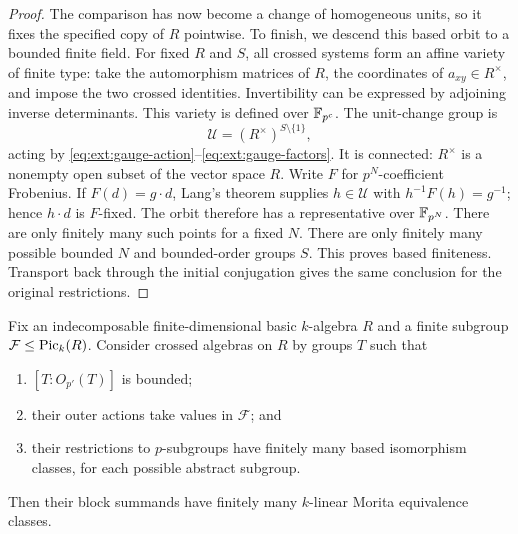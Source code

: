 \begin{proof}
The comparison has now become a change of homogeneous units,
so it fixes the specified copy of $R$ pointwise.  To finish, we
descend this based orbit to a bounded finite field.
For fixed $R$ and $S$, all crossed systems form an affine variety
of finite type: take the automorphism matrices of $R$, the
coordinates of $a_{xy}\in R^\times$, and impose the two crossed
identities.  Invertibility can be expressed by adjoining inverse
determinants.  This variety is defined over $\mathbb F_{p^c}$.  The
unit-change group is
\[
 \mathcal U=(R^\times)^{S\setminus\{1\}},
\]
acting by \eqref{eq:ext:gauge-action}--\eqref{eq:ext:gauge-factors}.
It is connected: $R^\times$ is a nonempty open subset of the
vector space $R$.  Write $F$ for $p^N$-coefficient Frobenius.  If
$F(d)=g\cdot d$, Lang's theorem \cite{Lang1956} supplies
$h\in\mathcal U$ with $h^{-1}F(h)=g^{-1}$; hence $h\cdot d$ is
$F$-fixed.  The orbit therefore has a representative over
$\mathbb F_{p^N}$.  There are only finitely many such points for a fixed
$N$.  There are only finitely many possible bounded $N$ and
bounded-order groups $S$.  This proves based finiteness.  Transport
back through the initial conjugation gives the same conclusion
for the original restrictions.
\end{proof}

\begin{lemma}\label{lem:ext:kernel-removal}
Fix an indecomposable finite-dimensional basic $k$-algebra $R$ and
a finite subgroup $\mathcal F\leq\operatorname{Pic}_k(R)$.  Consider crossed
algebras on $R$ by groups $T$ such that
\begin{enumerate}
\item $[T:O_{p'}(T)]$ is bounded;
\item their outer actions take values in $\mathcal F$; and
\item their restrictions to $p$-subgroups have finitely many based
isomorphism classes, for each possible abstract subgroup.
\end{enumerate}
Then their block summands have finitely many $k$-linear Morita
equivalence classes.
\end{lemma}

